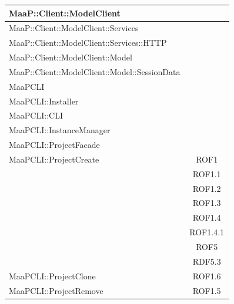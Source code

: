 \begin{center}
\begin{longtable}{|p{0.8\linewidth}|c|}
\midrule
MaaP::Client::ModelClient
& \\

\midrule
MaaP::Client::ModelClient::Services
& \\

\midrule
MaaP::Client::ModelClient::Services::HTTP
& \\

\midrule
MaaP::Client::ModelClient::Model
& \\

\midrule
MaaP::Client::ModelClient::Model::SessionData
& \\

\midrule
MaaPCLI
& \\

\midrule
MaaPCLI::Installer
& \\

\midrule
MaaPCLI::CLI
& \\

\midrule
MaaPCLI::InstanceManager
& \\

\midrule
MaaPCLI::ProjectFacade
& \\

\midrule
MaaPCLI::ProjectCreate
& ROF1\\
& ROF1.1\\
& ROF1.2\\
& ROF1.3\\
& ROF1.4\\
& ROF1.4.1\\
& ROF5\\
& RDF5.3\\

\midrule
MaaPCLI::ProjectClone
& ROF1.6\\

\midrule
MaaPCLI::ProjectRemove
& ROF1.5\\

\end{longtable}
\end{center}

\newpage
